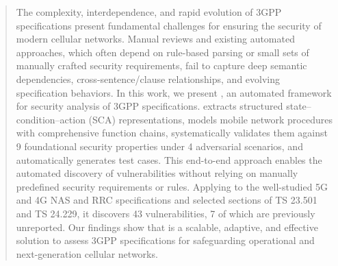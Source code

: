 \begin{abstract}
\noindent The complexity, interdependence, and rapid evolution of 3GPP specifications present fundamental challenges for ensuring the security of modern cellular networks. Manual reviews and existing automated approaches, which often depend on rule-based parsing or small sets of manually crafted security requirements, fail to capture deep semantic dependencies, cross-sentence/clause relationships, and evolving specification behaviors. In this work, we present \lm, an automated framework for security analysis of 3GPP specifications. \lm extracts structured state–condition–action (SCA) representations, models mobile network procedures with comprehensive function chains, systematically validates them against 9 foundational security properties under 4 adversarial scenarios, and automatically generates test cases. This end-to-end approach enables the automated discovery of vulnerabilities without relying on manually predefined security requirements or rules. Applying \lm to the well-studied 5G and 4G NAS and RRC specifications and selected sections of TS 23.501 and TS 24.229, it discovers 43 vulnerabilities, 7 of which are previously unreported. Our findings show that \lm is a scalable, adaptive, and effective solution to assess 3GPP specifications for safeguarding operational and next-generation cellular networks. 

\end{abstract}